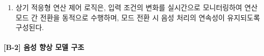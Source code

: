 \documentclass{article}
\begin{document}
\begin{enumerate}[label = \textbf{(B.1.\arabic*)}]
    상기 모드 전환에는 채터링 방지를 위한 히스테리시스가 적용되며, 일 실시예에서 제2 모드에서 제1 모드로의 복귀 시 외부 소음도 기준을 110\,dB\,SPL 미만, 포화 마스크 활성 비율을 5\% 미만으로 설정한다. 상기 각 임계값은 운용 환경에 따라 조정 가능한 설계 파라미터이며, 구체적인 상태 전이 조건 및 전환 절차는 후술하는 실시예(§7.3.2)에서 상세히 기술한다.

    \item 상기 적응형 연산 제어 로직은, 입력 조건의 변화를 실시간으로
    모니터링하여 연산 모드 간 전환을 동적으로 수행하며, 모드 전환 시
    음성 처리의 연속성이 유지되도록 구성된다.

\end{enumerate}


\paragraph{[B-2] 음성 향상 모델 구조}
\end{document}
